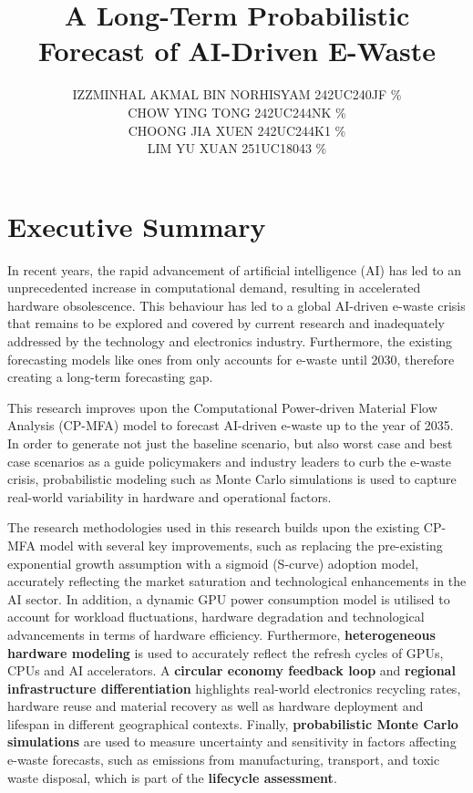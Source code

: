 \documentclass[a4paper, 12pt]{article}
\author{
IZZMINHAL AKMAL BIN NORHISYAM \quad 242UC240JF \quad 25\% \\
CHOW YING TONG \quad 242UC244NK \quad 25\% \\
CHOONG JIA XUEN \quad 242UC244K1 \quad 25\% \\
LIM YU XUAN \quad 251UC18043 \quad 25\% \\
}
\title{ A Long-Term Probabilistic Forecast of AI-Driven E-Waste }
\date{}
\begin{document}
\maketitle

\section*{Executive Summary}
In recent years, the rapid advancement of artificial intelligence (AI) has led to an unprecedented increase in computational demand, resulting in accelerated hardware obsolescence. This behaviour has led to a global AI-driven e-waste crisis that remains to be explored and covered by current research and inadequately addressed by the technology and electronics industry. Furthermore, the existing forecasting models like ones from \citet{wang_2024_ewaste} only accounts for e-waste until 2030, therefore creating a long-term forecasting gap. 
\par This research improves upon the Computational Power-driven Material Flow Analysis (CP-MFA) model to forecast AI-driven e-waste up to the year of 2035. In order to generate not just the baseline scenario, but also worst case and best case scenarios as a guide policymakers and industry leaders to curb the e-waste crisis, probabilistic modeling such as Monte Carlo simulations is used to capture real-world variability in hardware and operational factors.
\par The research methodologies used in this research builds upon the existing CP-MFA model with several key improvements, such as replacing the pre-existing exponential growth assumption with a sigmoid (S-curve) adoption model, accurately reflecting the market saturation and technological enhancements in the AI sector. In addition, a dynamic GPU power consumption model is utilised to account for workload fluctuations, hardware degradation and technological advancements in terms of hardware efficiency. Furthermore, \textbf{heterogeneous hardware modeling} is used to accurately reflect the refresh cycles of GPUs, CPUs and AI accelerators. A \textbf{circular economy feedback loop} and \textbf{regional infrastructure differentiation} highlights real-world electronics recycling rates, hardware reuse and material recovery as well as hardware deployment and lifespan in different geographical contexts. Finally, \textbf{probabilistic Monte Carlo simulations} are used to measure uncertainty and sensitivity in factors affecting e-waste forecasts, such as emissions from manufacturing, transport, and toxic waste disposal, which is part of the \textbf{lifecycle assessment}.
\end{document}
